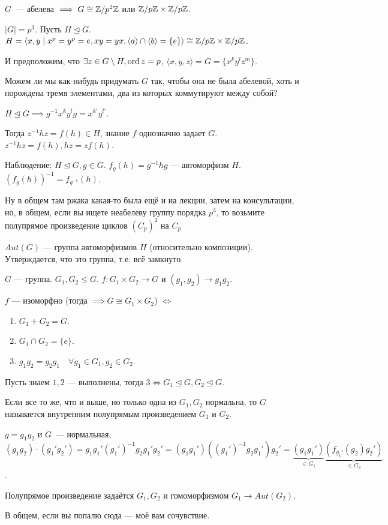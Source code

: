 \begin{remark}
    $G$~--- абелева $\implies G \cong \mathbb{Z} / p^2 \mathbb{Z}$ или $\mathbb{Z} / p \mathbb{Z} \times \mathbb{Z} / p \mathbb{Z}$.
\end{remark}
\begin{example}
    $|G| = p^3$.
    Пусть $H \trianglelefteq G$.  $H = \langle x, y \mid x^p = y^p = e, xy=yx, \langle a\rangle \cap \langle b\rangle = \{e\}\rangle \cong \mathbb{Z} / p\mathbb{Z} \times \mathbb{Z} / p\mathbb{Z}$.

     И предположим, что $\exists z \in G \setminus H, \operatorname{ord} z = p$, $\langle x, y, z\rangle = G = \{ x^k y^l z^m \}$.

     Можем ли мы как-нибудь придумать $G$ так, чтобы она не была абелевой, хоть и порождена тремя элементами, два из которых коммутируют между собой?

     $H \trianglelefteq G \implies g^{-1}x^{k}y^{l}g = x^{k'}y^{l'}$.

     Тогда $z^{-1}hz = f(h) \in H$, знание  $f$ однозначно задает  $G$.  $z^{-1}hz = f(h), hz = zf(h)$.

     Наблюдение: $H \trianglelefteq G, g \in G$.  $f_g(h) = g^{-1}hg$ --- автоморфизм  $H$. $(f_g(h))^{-1} = f_{g^{-1}}(h)$.

     Ну в общем там ржака какая-то была ещё и на лекции, затем на консультации, но, в общем, если вы ищете неабелеву группу порядка $p^3$, то возьмите полупрямое произведение циклов $(C_p)^2$ на $C_p$
\end{example}
\begin{definition}
    $Aut(G)$ --- группа автоморфизмов  $H$ (относительно композиции). Утверждается, что это группа, т.е. всё замкнуто. 
\end{definition}
\begin{statement}
    $G$ --- группа.  $G_1, G_2 \le G$. $f\!: G_1 \times G_2 \to G$ и $(g_1,g_2) \to g_1g_2$.

    $f$ --- изоморфно (тогда $\implies G \cong G_1 \times G_2$) $\iff$
    \begin{enumerate}
        \item $G_1+G_2 = G$.
        \item $G_1 \cap G_2 = \{e\}$.
        \item $g_1g_2 = g_2g_1\quad \forall g_1 \in G_1, g_2 \in G_2$.
    \end{enumerate}
\end{statement}
\begin{exerc}
    Пусть знаем $1, 2$ --- выполнены, тогда  $3 \iff G_1 \trianglelefteq G, G_2 \trianglelefteq G$.
\end{exerc}
\begin{definition}
    Если все то же, что и выше, но только одна из $G_1, G_2$ нормальна, то $G$ называется внутренним полупрямым произведением  $G_1$ и $G_2$.

    $g = g_1g_2$ и $G$~--- нормальная, $(g_1g_2) \cdot (g_1' g_2') = g_1g_1'(g_1')^{-1}g_2g_1'g_2' = (g_1g_1')((g_1')^{-1}g_2g_1')g_2' = \underbrace{(g_1g_1')}_{\in G_1}\underbrace{(f_{g_1'}(g_2)g_2')}_{\in G_2}$.

    Полупрямое произведение задаётся $G_1, G_2$ и гомоморфизмом $G_1 \to Aut(G_2)$.
\end{definition}

В общем, если вы попалю сюда --- моё вам сочувствие.
